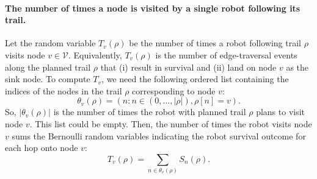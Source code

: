 \documentclass[11pt, oneside]{article}
\begin{document}
\paragraph{The number of times a node is visited by a single robot following its trail.} 
Let the random variable $T_v(\rho)$ be the number of times a robot following trail $\rho$ visits node $v\in \mathcal{V}$.
Equivalently, $T_v(\rho)$ is the number of edge-traversal events along the planned trail $\rho$ that (i) result in survival and (ii) land on node $v$ as the sink node. 
To compute $T_v$, we need the following ordered list containing the indices of the nodes in the trail $\rho$ corresponding to node $v$:
\begin{equation}
	\theta_v(\rho) = (n : n \in (0, ..., \lvert \rho \rvert) ,  \rho[n] = v).
\end{equation} So, $\lvert \theta_v(\rho) \rvert$ is the number of times the robot with planned trail $\rho$ plans to visit node $v$. This list could be empty.
Then, the number of times the robot visits node $v$ sums the Bernoulli random variables indicating the robot survival outcome for each hop onto node $v$:
\begin{equation}
	T_v(\rho) = \sum_{n \in \theta_v(\rho) } S_n(\rho). %
	\label{eq:T_v}
\end{equation}
\end{document}
